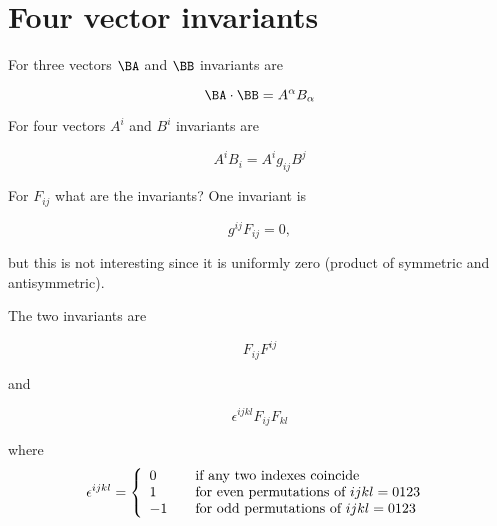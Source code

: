 %
%
\section{Four vector invariants}

For three vectors $\BA$ and $\BB$ invariants are

\begin{equation}\label{eqn:relativisticElectrodynamicsL11:510}
\BA \cdot \BB = A^\alpha B_\alpha
\end{equation}

For four vectors $A^i$ and $B^i$ invariants are

\begin{equation}\label{eqn:relativisticElectrodynamicsL11:530}
A^i B_i = A^i g_{i j} B^j  
\end{equation}

For $F_{i j}$ what are the invariants?  One invariant is

\begin{equation}\label{eqn:relativisticElectrodynamicsL11:550}
g^{i j} F_{i j} = 0,
\end{equation}

but this is not interesting since it is uniformly zero (product of symmetric and antisymmetric).

The two invariants are

\begin{equation}\label{eqn:relativisticElectrodynamicsL11:570}
F_{i j}F^{i j}
\end{equation}

and 

\begin{equation}\label{eqn:relativisticElectrodynamicsL11:590}
\epsilon^{i j k l} F_{i j}F_{k l}
\end{equation}

where
\begin{equation}\label{eqn:relativisticElectrodynamicsL11:610}
\epsilon^{i j k l} =
\left\{
\begin{array}{l l}
0 & \quad \mbox{if any two indexes coincide} \\
1 & \quad \mbox{for even permutations of $i j k l=0123$ } \\
-1 & \quad \mbox{for odd permutations of $i j k l=0123$ } \\
\end{array}
\right.
\end{equation}

